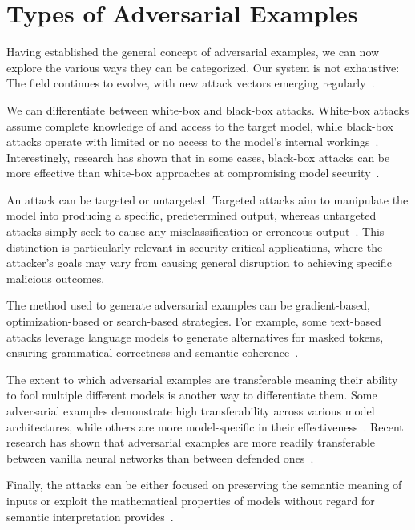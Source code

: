 \documentclass[a4paper, oneside]{discothesis}
\begin{document}
\section{Types of Adversarial Examples}

Having established the general concept of adversarial examples, we can now explore the various ways they can be categorized. Our system is not exhaustive: The field continues to evolve, with new attack vectors emerging regularly~\cite{Khaleel2024AdversarialAI}.

We can differentiate between white-box and black-box attacks. White-box attacks assume complete knowledge of and access to the target model, while black-box attacks operate with limited or no access to the model's internal workings~\cite{capozzi2024adversarial}. Interestingly, research has shown that in some cases, black-box attacks can be more effective than white-box approaches at compromising model security~\cite{capozzi2024adversarial}.

An attack can be targeted or untargeted. Targeted attacks aim to manipulate the model into producing a specific, predetermined output, whereas untargeted attacks simply seek to cause any misclassification or erroneous output~\cite{capozzi2024adversarial, Kashyap2024AdversarialAA}. This distinction is particularly relevant in security-critical applications, where the attacker's goals may vary from causing general disruption to achieving specific malicious outcomes.

The method used to generate adversarial examples can be gradient-based, optimization-based or search-based strategies. For example, some text-based attacks leverage language models to generate alternatives for masked tokens, ensuring grammatical correctness and semantic coherence~\cite{garg2020bae}.

The extent to which adversarial examples are transferable \textendash{} meaning their ability to fool multiple different models \textendash{} is another way to differentiate them. Some adversarial examples demonstrate high transferability across various model architectures, while others are more model-specific in their effectiveness~\cite{Li2022ASO, li2022review}. Recent research has shown that adversarial examples are more readily transferable between vanilla neural networks than between defended ones~\cite{li2019nattack, zheng2023black}.

Finally, the attacks can be either focused on preserving the semantic meaning of inputs or exploit the mathematical properties of models without regard for semantic interpretation provides~\cite{browne2020semantics}.
\end{document}
